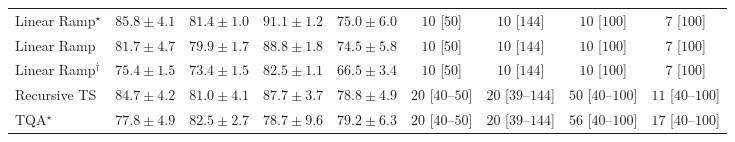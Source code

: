 \begin{tabular}{l|cccc|cccc|}
Linear Ramp$^\star$ & {\cellcolor[HTML]{84248A}} \color[HTML]{F1F1F1} $85.8\pm 4.1$ & {\cellcolor[HTML]{894CA2}} \color[HTML]{F1F1F1} $81.4\pm 1.0$ & {\cellcolor[HTML]{62065F}} \color[HTML]{F1F1F1} $91.1\pm 1.2$ & {\cellcolor[HTML]{8C80BB}} \color[HTML]{F1F1F1} $75.0\pm 6.0$ & {\cellcolor[HTML]{FFF7F3}} \color[HTML]{000000} $10$ [$50$] & {\cellcolor[HTML]{FFF7F3}} \color[HTML]{000000} $10$ [$144$] & {\cellcolor[HTML]{FFF7F3}} \color[HTML]{000000} $10$ [$100$] & {\cellcolor[HTML]{FFF7F3}} \color[HTML]{000000} $7$ [$100$] \\
Linear Ramp & {\cellcolor[HTML]{8949A1}} \color[HTML]{F1F1F1} $81.7\pm 4.7$ & {\cellcolor[HTML]{8A58A8}} \color[HTML]{F1F1F1} $79.9\pm 1.7$ & {\cellcolor[HTML]{790D75}} \color[HTML]{F1F1F1} $88.8\pm 1.8$ & {\cellcolor[HTML]{8C84BD}} \color[HTML]{F1F1F1} $74.5\pm 5.8$ & {\cellcolor[HTML]{FFF7F3}} \color[HTML]{000000} $10$ [$50$] & {\cellcolor[HTML]{FFF7F3}} \color[HTML]{000000} $10$ [$144$] & {\cellcolor[HTML]{FFF7F3}} \color[HTML]{000000} $10$ [$100$] & {\cellcolor[HTML]{FFF7F3}} \color[HTML]{000000} $7$ [$100$] \\
Linear Ramp$^\dagger$ & {\cellcolor[HTML]{8C7CB9}} \color[HTML]{F1F1F1} $75.4\pm 1.5$ & {\cellcolor[HTML]{8C8CC1}} \color[HTML]{F1F1F1} $73.4\pm 1.5$ & {\cellcolor[HTML]{88439E}} \color[HTML]{F1F1F1} $82.5\pm 1.1$ & {\cellcolor[HTML]{A1BEDB}} \color[HTML]{000000} $66.5\pm 3.4$ & {\cellcolor[HTML]{FFF7F3}} \color[HTML]{000000} $10$ [$50$] & {\cellcolor[HTML]{FFF7F3}} \color[HTML]{000000} $10$ [$144$] & {\cellcolor[HTML]{FFF7F3}} \color[HTML]{000000} $10$ [$100$] & {\cellcolor[HTML]{FFF7F3}} \color[HTML]{000000} $7$ [$100$] \\
Recursive TS & {\cellcolor[HTML]{852F91}} \color[HTML]{F1F1F1} $84.7\pm 4.2$ & {\cellcolor[HTML]{894FA3}} \color[HTML]{F1F1F1} $81.0\pm 4.1$ & {\cellcolor[HTML]{81127E}} \color[HTML]{F1F1F1} $87.7\pm 3.7$ & {\cellcolor[HTML]{8B61AC}} \color[HTML]{F1F1F1} $78.8\pm 4.9$ & {\cellcolor[HTML]{FFF4F0}} \color[HTML]{000000} $20$ [$40$--$50$] & {\cellcolor[HTML]{FFF4F0}} \color[HTML]{000000} $20$ [$39$--$144$] & {\cellcolor[HTML]{FEEEEA}} \color[HTML]{000000} $50$ [$40$--$100$] & {\cellcolor[HTML]{FFF6F2}} \color[HTML]{000000} $11$ [$40$--$100$] \\
TQA$^\star$ & {\cellcolor[HTML]{8C69B0}} \color[HTML]{F1F1F1} $77.8\pm 4.9$ & {\cellcolor[HTML]{88439E}} \color[HTML]{F1F1F1} $82.5\pm 2.7$ & {\cellcolor[HTML]{8B61AC}} \color[HTML]{F1F1F1} $78.7\pm 9.6$ & {\cellcolor[HTML]{8B5DAA}} \color[HTML]{F1F1F1} $79.2\pm 6.3$ & {\cellcolor[HTML]{FFF4F0}} \color[HTML]{000000} $20$ [$40$--$50$] & {\cellcolor[HTML]{FFF4F0}} \color[HTML]{000000} $20$ [$39$--$144$] & {\cellcolor[HTML]{FEECE9}} \color[HTML]{000000} $56$ [$40$--$100$] & {\cellcolor[HTML]{FFF5F1}} \color[HTML]{000000} $17$ [$40$--$100$] \\

\end{tabular}
